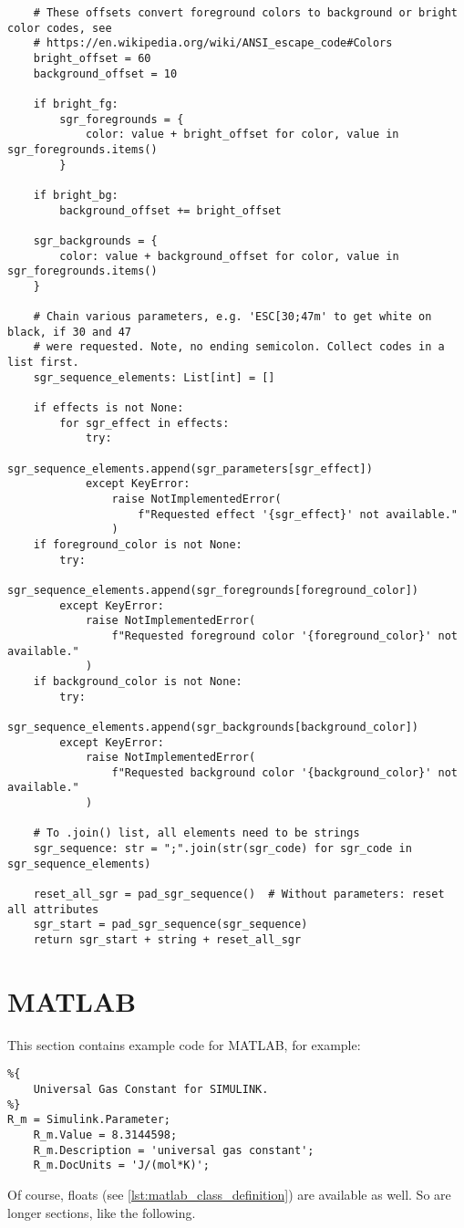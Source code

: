 \begin{verbatim}
    # These offsets convert foreground colors to background or bright color codes, see
    # https://en.wikipedia.org/wiki/ANSI_escape_code#Colors
    bright_offset = 60
    background_offset = 10

    if bright_fg:
        sgr_foregrounds = {
            color: value + bright_offset for color, value in sgr_foregrounds.items()
        }

    if bright_bg:
        background_offset += bright_offset

    sgr_backgrounds = {
        color: value + background_offset for color, value in sgr_foregrounds.items()
    }

    # Chain various parameters, e.g. 'ESC[30;47m' to get white on black, if 30 and 47
    # were requested. Note, no ending semicolon. Collect codes in a list first.
    sgr_sequence_elements: List[int] = []

    if effects is not None:
        for sgr_effect in effects:
            try:
                sgr_sequence_elements.append(sgr_parameters[sgr_effect])
            except KeyError:
                raise NotImplementedError(
                    f"Requested effect '{sgr_effect}' not available."
                )
    if foreground_color is not None:
        try:
            sgr_sequence_elements.append(sgr_foregrounds[foreground_color])
        except KeyError:
            raise NotImplementedError(
                f"Requested foreground color '{foreground_color}' not available."
            )
    if background_color is not None:
        try:
            sgr_sequence_elements.append(sgr_backgrounds[background_color])
        except KeyError:
            raise NotImplementedError(
                f"Requested background color '{background_color}' not available."
            )

    # To .join() list, all elements need to be strings
    sgr_sequence: str = ";".join(str(sgr_code) for sgr_code in sgr_sequence_elements)

    reset_all_sgr = pad_sgr_sequence()  # Without parameters: reset all attributes
    sgr_start = pad_sgr_sequence(sgr_sequence)
    return sgr_start + string + reset_all_sgr
\end{verbatim}

\section{MATLAB}

This section contains example code for MATLAB, for example:
\begin{verbatim}
%{
    Universal Gas Constant for SIMULINK.
%}
R_m = Simulink.Parameter;
    R_m.Value = 8.3144598;
    R_m.Description = 'universal gas constant';
    R_m.DocUnits = 'J/(mol*K)';
\end{verbatim}
Of course, floats (see \cref{lst:matlab_class_definition}) are available as well.
So are longer sections, like the following.

